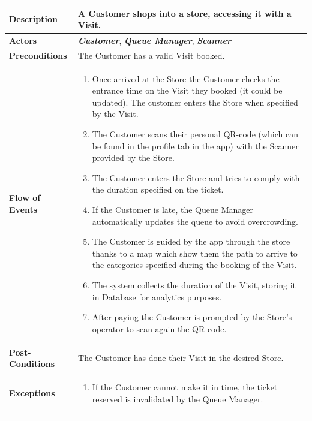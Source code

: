 \documentclass[a4paper, 12pt, oneside]{article}
\begin{document}
\begin{enumerate}[labelindent=20pt, label={UC.\arabic*}, itemindent=1em,leftmargin=!]
\begin{tabularx}{\linewidth}{| l | X |}
    \hline
    \textbf{Description} & A Customer shops into a store, accessing it with a Visit.\\
    

    \hline
    \textbf{Actors} & \textbf{\textit{Customer}}, \textit{\textbf{Queue Manager}}, \textit{\textbf{Scanner}}  \\
    
    \hline
    \textbf{Preconditions} & The Customer has a valid Visit booked.\\
    
    \hline
    \textbf{Flow of Events} & \parbox{0.7\textwidth}{   
        \begin{enumerate}
            \item Once arrived at the Store the Customer checks the entrance time on the Visit they booked (it could be updated). The customer enters the Store when specified by the Visit.
            \item The Customer scans their personal QR-code (which can be found in the profile tab in the app) with the Scanner provided by the Store.
            \item The Customer enters the Store and tries to comply with the duration specified on the ticket.
            \item If the Customer is late, the Queue Manager automatically updates the queue to avoid overcrowding.
            \item The Customer is guided by the app through the store thanks to a map which show them the path to arrive to the categories specified during the booking of the Visit.
            \item The system collects the duration of the Visit, storing it in Database for analytics purposes.
            \item After paying the Customer is prompted by the Store's operator to scan again the QR-code.
    \end{enumerate}}\\
    
    \hline
    \textbf{Post-Conditions} & The Customer has done their Visit in the desired Store.\\
    
    \hline
    \textbf{Exceptions} & \parbox{0.7\textwidth}{ \begin{enumerate}
            \item If the Customer cannot make it in time, the ticket reserved is invalidated by the Queue Manager.
        \end{enumerate}}\\


\end{tabularx}
\end{enumerate}
\end{document}
